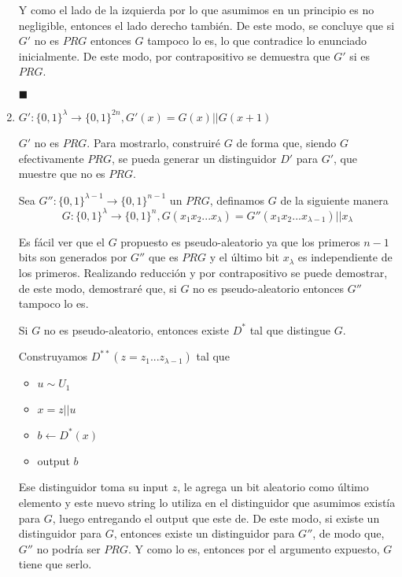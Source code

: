 \documentclass[twoside]{tareas}
\begin{document}
\begin{enumerate}
    Y como el lado de la izquierda por lo que asumimos en un principio es no negligible, entonces el lado derecho también. De este modo, se concluye que si $G'$ no es $PRG$ entonces $G$ tampoco lo es, lo que contradice lo enunciado inicialmente. De este modo, por contrapositivo se demuestra que $G'$ si es $PRG$.
    \begin{flushright} $\blacksquare$ \end{flushright}

    \item {\boldmath$G': \{0,1\}^{\lambda} \rightarrow \{0,1\}^{2n}, G'(x) = G(x)||G(x+1)$}

    $G'$ no es $PRG$. Para mostrarlo, construiré $G$ de forma que, siendo $G$ efectivamente $PRG$, se pueda generar un distinguidor $D'$ para $G'$, que muestre que no es $PRG$.

    Sea $G'': \{0,1\}^{\lambda - 1} \rightarrow \{0,1\}^{n-1}$ un $PRG$, definamos $G$ de la siguiente manera
    $$G: \{0,1\}^{\lambda} \rightarrow \{0,1\}^{n}, G(x_1 x_2 ...x_{\lambda}) = G''(x_1 x_2 ...x_{\lambda - 1}) || x_{\lambda}$$

    Es fácil ver que el $G$ propuesto es pseudo-aleatorio ya que los primeros $n-1$ bits son generados por $G''$ que es $PRG$ y el último bit $x_{\lambda}$ es independiente de los primeros. Realizando reducción y por contrapositivo se puede demostrar, de este modo, demostraré que, si $G$ no es pseudo-aleatorio entonces $G''$ tampoco lo es.

    Si $G$ no es pseudo-aleatorio, entonces existe $D^*$ tal que distingue $G$.

    Construyamos $D^{**}(z=z_1...z_{\lambda-1})$ tal que

    \begin{itemize}
        \item $u \sim U_1$
        \item $x = z || u$
        \item $b \leftarrow D^*(x)$
        \item output $b$
    \end{itemize}

    Ese distinguidor toma su input $z$, le agrega un bit aleatorio como último elemento y este nuevo string lo utiliza en el distinguidor que asumimos existía para $G$, luego entregando el output que este de. De este modo, si existe un distinguidor para $G$, entonces existe un distinguidor para $G''$, de modo que, $G''$ no podría ser $PRG$. Y como lo es, entonces por el argumento expuesto, $G$ tiene que serlo.


\end{enumerate}
\end{document}
